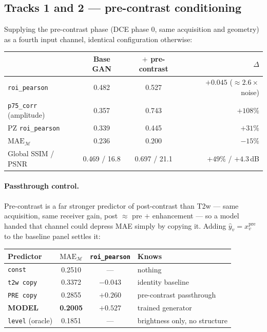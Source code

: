 \documentclass[11pt]{article}
\newcommand{\yhat}{\hat{y}}
\newcommand{\roi}{\mathcal{M}}
\newcommand{\1}{\mathbb{1}}
\begin{document}
\subsection{Tracks 1 and 2 --- pre-contrast conditioning}

Supplying the pre-contrast phase (DCE phase 0, same acquisition and geometry) as a fourth
input channel, identical configuration otherwise:

\begin{center}
\begin{tabular}{lccr}
\toprule
& Base GAN & $+$ pre-contrast & $\Delta$ \\
\midrule
\texttt{roi\_pearson} & 0.482 & 0.527 & $+0.045$ ($\approx2.6\times$ noise) \\
\texttt{p75\_corr} (amplitude) & 0.357 & 0.743 & $+108\%$ \\
PZ \texttt{roi\_pearson} & 0.339 & 0.445 & $+31\%$ \\
$\mathrm{MAE}_{\roi}$ & 0.236 & 0.200 & $-15\%$ \\
Global SSIM / PSNR & 0.469 / 16.8 & 0.697 / 21.1 & $+49\%$ / $+4.3$\,dB \\
\bottomrule
\end{tabular}
\end{center}

\paragraph{Passthrough control.} Pre-contrast is a far stronger predictor of post-contrast
than T2w --- same acquisition, same receiver gain, post $\approx$ pre $+$ enhancement --- so
a model handed that channel could depress MAE simply by copying it. Adding
$\yhat_v=x^{\text{pre}}_v$ to the baseline panel settles it:

\begin{center}
\begin{tabular}{lccl}
\toprule
Predictor & $\mathrm{MAE}_{\roi}$ & \texttt{roi\_pearson} & Knows \\
\midrule
\texttt{const} & 0.2510 & --- & nothing \\
\texttt{t2w copy} & 0.3372 & $-0.043$ & identity baseline \\
\texttt{PRE copy} & 0.2855 & $+0.260$ & pre-contrast passthrough \\
\textbf{MODEL} & \textbf{0.2005} & $\mathbf{+0.527}$ & trained generator \\
\texttt{level} (oracle) & 0.1851 & --- & brightness only, no structure \\
\bottomrule
\end{tabular}
\end{center}
\end{document}
